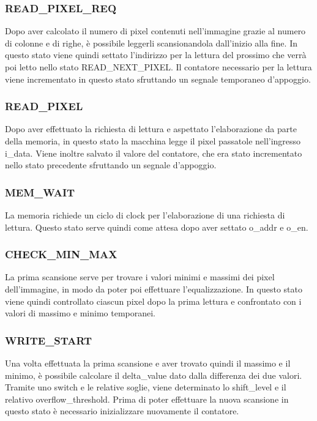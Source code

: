 \documentclass{article}
\begin{document}
\subsubsection{READ\_PIXEL\_REQ}
Dopo aver calcolato il numero di pixel contenuti nell'immagine grazie al numero di colonne e di righe, è possibile leggerli scansionandola dall'inizio alla fine. In questo stato viene quindi settato l'indirizzo per la lettura del prossimo che verrà poi letto nello stato READ\_NEXT\_PIXEL. Il contatore necessario per la lettura viene incrementato in questo stato sfruttando un segnale temporaneo d'appoggio.

\subsubsection{READ\_PIXEL}
Dopo aver effettuato la richiesta di lettura e aspettato l'elaborazione da parte della memoria, in questo stato la macchina legge il pixel passatole nell'ingresso i\_data. Viene inoltre salvato il valore del contatore, che era stato incrementato nello stato precedente sfruttando un segnale d'appoggio.

\subsubsection{MEM\_WAIT}
La memoria richiede un ciclo di clock per l'elaborazione di una richiesta di lettura. Questo stato serve quindi come attesa dopo aver settato o\_addr e o\_en.

\subsubsection{CHECK\_MIN\_MAX}
La prima scansione serve per trovare i valori minimi e massimi dei pixel dell'immagine, in modo da poter poi effettuare l'equalizzazione. In questo stato viene quindi controllato ciascun pixel dopo la prima lettura e confrontato con i valori di massimo e minimo temporanei.

\subsubsection{WRITE\_START}
Una volta effettuata la prima scansione e aver trovato quindi il massimo e il minimo, è possibile calcolare il delta\_value dato dalla differenza dei due valori. Tramite uno switch e le relative soglie, viene determinato lo shift\_level e il relativo overflow\_threshold. Prima di poter effettuare la nuova scansione in questo stato è necessario inizializzare nuovamente il contatore.
\end{document}
